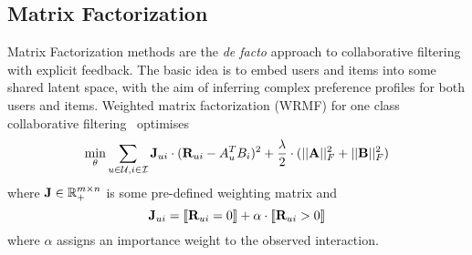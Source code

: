 \subsection{Matrix Factorization}

Matrix Factorization methods are the \emph{de facto} approach to collaborative filtering with explicit feedback. The basic idea is to embed users and items into some shared latent space, with the aim of inferring complex preference profiles for both users and items. 
Weighted matrix factorization (WRMF) for one class collaborative filtering~\cite{Hu:2008, Pan:2009} optimises
\begin{equation}
\label{eqn:wrmf}
\min_{ \theta } \sum_{ u \in \mathcal{U}, i \in \mathcal{I} } \mathbf{J}_{ui} \cdot ( \mathbf{R}_{ui} - A_u^T B_i )^2 + \frac{\lambda}{2} \cdot ( ||\mathbf{A}||_F^2 + ||\mathbf{B}||_F^2 )
\end{equation}
where 
$\mathbf{J} \in \mathbb{R}_+^{m \times n}$ is some pre-defined weighting matrix  and 
\begin{equation}
\label{eqn:wrmf-weight}
\mathbf{J}_{ui} =  \llbracket  \mathbf{R}_{ui} = 0  \rrbracket + \alpha \cdot \llbracket  \mathbf{R}_{ui} > 0  \rrbracket 
\end{equation}
where $\alpha$ assigns an importance weight to the observed interaction.



